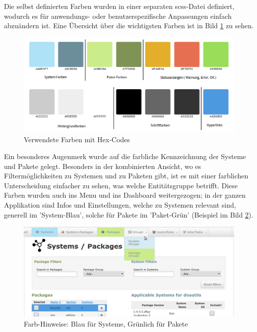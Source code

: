 Die selbst definierten Farben wurden in einer separaten \gls{scss}-Datei definiert, wodurch es für anwendungs- oder benutzerspezifische Anpassungen einfach abzuändern ist. Eine Übersicht über die wichtigsten Farben ist in Bild \ref{fig:design:colorcodes} zu sehen.

\begin{figure}[H]
	\centering
	\includegraphics[width=\linewidth]{files/colorcodes}
	\caption{Verwendete Farben mit Hex-Codes}
	\label{fig:design:colorcodes}
\end{figure}

Ein besonderes Augenmerk wurde auf die farbliche Kennzeichnung der Systeme und Pakete gelegt. Besonders in der kombinierten Ansicht, wo es Filtermöglichkeiten zu Systemen und zu Paketen gibt, ist es mit einer farblichen Unterscheidung einfacher zu sehen, was welche Entitätsgruppe betrifft. Diese Farben wurden auch ins Menu und ins Dashboard weitergezogen; in der ganzen Applikation sind Infos und Einstellungen, welche zu Systemen relevant sind, generell im 'System-Blau', solche für Pakete im 'Paket-Grün' (Beispiel im Bild \ref{fig:design:sys_pkg_colors}).

\begin{figure}[H]
	\centering
	\includegraphics[width=\linewidth]{files/colors_pkg_sys}
	\caption{Farb-Hinweise: Blau für Systeme, Grünlich für Pakete}
	\label{fig:design:sys_pkg_colors}
\end{figure}

